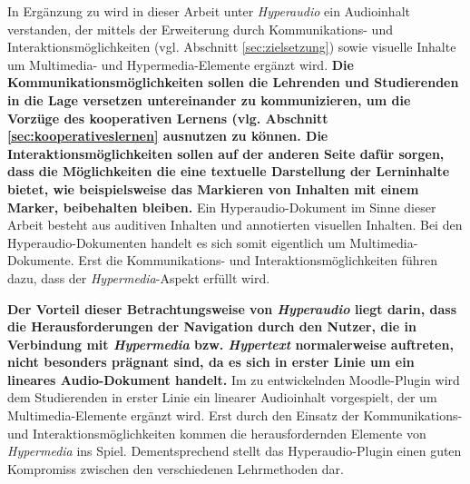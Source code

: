 In Ergänzung zu \cite{zumbach2006learning} wird in dieser Arbeit unter \textit{Hyperaudio} ein Audioinhalt verstanden, der mittels der Erweiterung durch Kommunikations- und Interaktionsmöglichkeiten (vgl. Abschnitt \ref{sec:zielsetzung}) sowie visuelle Inhalte um Multimedia- und Hypermedia-Elemente ergänzt wird. \textbf{Die Kommunikationsmöglichkeiten sollen die Lehrenden und Studierenden in die Lage versetzen untereinander zu kommunizieren, um die Vorzüge des kooperativen Lernens (vlg. Abschnitt \ref{sec:kooperativeslernen} ausnutzen zu können. Die Interaktionsmöglichkeiten sollen auf der anderen Seite dafür sorgen, dass die Möglichkeiten die eine textuelle Darstellung der Lerninhalte bietet, wie beispielsweise das Markieren von Inhalten mit einem Marker, beibehalten bleiben.} Ein Hyperaudio-Dokument im Sinne dieser Arbeit besteht aus auditiven Inhalten und annotierten visuellen Inhalten. Bei den Hyperaudio-Dokumenten handelt es sich somit eigentlich um Multimedia-Dokumente. Erst die Kommunikations- und Interaktionsmöglichkeiten führen dazu, dass der \textit{Hypermedia}-Aspekt erfüllt wird.

\textbf{Der Vorteil dieser Betrachtungsweise von \textit{Hyperaudio} liegt darin, dass die Herausforderungen der Navigation durch den Nutzer, die in Verbindung mit \textit{Hypermedia} bzw. \textit{Hypertext} normalerweise auftreten, nicht besonders prägnant sind, da es sich in erster Linie um ein lineares Audio-Dokument handelt.} Im zu entwickelnden Moodle-Plugin wird dem Studierenden in erster Linie ein linearer Audioinhalt vorgespielt, der um Multimedia-Elemente ergänzt wird. Erst durch den Einsatz der Kommunikations- und Interaktionsmöglichkeiten kommen die herausfordernden Elemente von \textit{Hypermedia} ins Spiel. Dementsprechend stellt das Hyperaudio-Plugin einen guten Kompromiss zwischen den verschiedenen Lehrmethoden dar.


